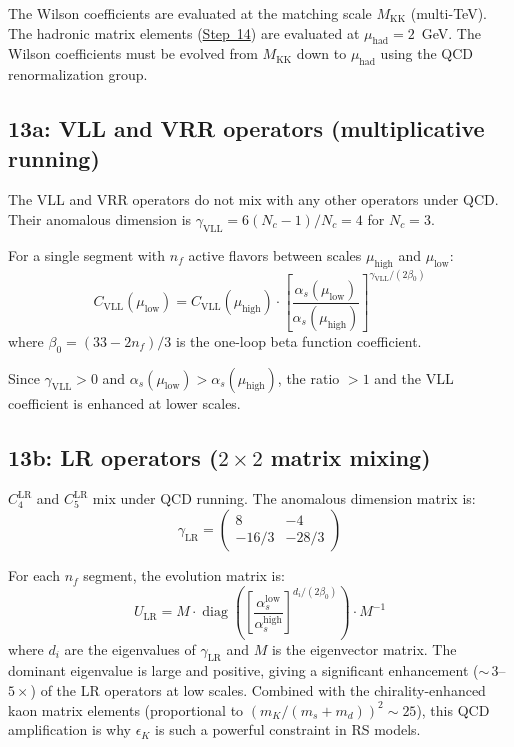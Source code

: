 \documentclass[11pt]{article}
\newcommand{\Mkk}{M_{\mathrm{KK}}}
\begin{document}
The Wilson coefficients are evaluated at the matching scale $\Mkk$ (multi-TeV).
The hadronic matrix elements (\hyperref[sec:step14]{Step~14}) are evaluated at
$\mu_{\mathrm{had}} = 2$~GeV.  The Wilson coefficients must be evolved from
$\Mkk$ down to $\mu_{\mathrm{had}}$ using the QCD renormalization group.

\subsection{13a: VLL and VRR operators (multiplicative running)}
\label{sec:step13a}

The VLL and VRR operators do not mix with any other operators under QCD.  Their
anomalous dimension is
$\gamma_{\mathrm{VLL}} = 6(N_c-1)/N_c = 4$ for $N_c = 3$.

For a single segment with $n_f$ active flavors between scales $\mu_{\mathrm{high}}$
and $\mu_{\mathrm{low}}$:
\begin{equation}
  C_{\mathrm{VLL}}(\mu_{\mathrm{low}}) =
    C_{\mathrm{VLL}}(\mu_{\mathrm{high}}) \cdot
    \left[\frac{\alpha_s(\mu_{\mathrm{low}})}
               {\alpha_s(\mu_{\mathrm{high}})}\right]^{\gamma_{\mathrm{VLL}}/(2\beta_0)}
\end{equation}
where $\beta_0 = (33 - 2n_f)/3$ is the one-loop beta function coefficient.

Since $\gamma_{\mathrm{VLL}} > 0$ and
$\alpha_s(\mu_{\mathrm{low}}) > \alpha_s(\mu_{\mathrm{high}})$, the ratio
$> 1$ and the VLL coefficient is enhanced at lower scales.

\subsection{13b: LR operators ($2\times2$ matrix mixing)}
\label{sec:step13b}

$C_4^{\mathrm{LR}}$ and $C_5^{\mathrm{LR}}$ mix under QCD running.  The
anomalous dimension matrix is:
\begin{equation}
  \gamma_{\mathrm{LR}} = \begin{pmatrix} 8 & -4 \\ -16/3 & -28/3 \end{pmatrix}
\end{equation}

For each $n_f$ segment, the evolution matrix is:
\begin{equation}
  U_{\mathrm{LR}} = M \cdot \operatorname{diag}\!\left(
    \left[\frac{\alpha_s^{\mathrm{low}}}{\alpha_s^{\mathrm{high}}}\right]
    ^{d_i/(2\beta_0)}\right) \cdot M^{-1}
\end{equation}
where $d_i$ are the eigenvalues of $\gamma_{\mathrm{LR}}$ and $M$ is the
eigenvector matrix.  The dominant eigenvalue is large and positive, giving a
significant enhancement (${\sim}\,3$--$5\times$) of the LR operators at low
scales.  Combined with the chirality-enhanced kaon matrix elements
(proportional to $(m_K/(m_s + m_d))^2 \sim 25$), this QCD amplification is
why $\epsilon_K$ is such a powerful constraint in RS models.
\end{document}
